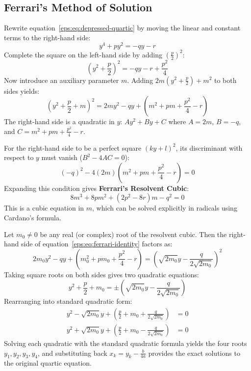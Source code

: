 \documentclass[a4paper]{article}
\begin{document}
\subsection{Ferrari's Method of Solution}
Rewrite equation~\eqref{eps:eq:depressed-quartic} by moving the linear and constant terms to the right-hand side:
\[
    y^4 + p y^2 = -q y - r
\]
Complete the square on the left-hand side by adding $\left(\frac{p}{2}\right)^2$:
\[
    \left(y^2 + \frac{p}{2}\right)^2 = -q y - r + \frac{p^2}{4}
\]
Now introduce an auxiliary parameter $m$. Adding $2m\left(y^2 + \frac{p}{2}\right) + m^2$ to both sides yields:
\begin{equation}
    \left(y^2 + \frac{p}{2} + m\right)^2 = 2m y^2 - q y + \left(m^2 + pm + \frac{p^2}{4} - r\right) \label{eps:eq:ferrari-identity}
\end{equation}
The right-hand side is a quadratic in $y$: $A y^2 + B y + C$ where $A = 2m$, $B = -q$, and $C = m^2 + pm + \frac{p^2}{4} - r$.

For the right-hand side to be a perfect square $(k y + l)^2$, its discriminant with respect to $y$ must vanish ($B^2 - 4AC = 0$):
\[
    (-q)^2 - 4(2m)\left(m^2 + pm + \frac{p^2}{4} - r\right) = 0
\]
Expanding this condition gives \textbf{Ferrari's Resolvent Cubic}:
\begin{equation}
    \boxed{8m^3 + 8pm^2 + (2p^2 - 8r)m - q^2 = 0} \label{eps:eq:resolvent-cubic}
\end{equation}
This is a cubic equation in $m$, which can be solved explicitly in radicals using Cardano's formula.

Let $m_0 \ne 0$ be any real (or complex) root of the resolvent cubic. Then the right-hand side of equation~\eqref{eps:eq:ferrari-identity} factors as:
\[
    2m_0 y^2 - q y + \left(m_0^2 + pm_0 + \frac{p^2}{4} - r\right) = \left( \sqrt{2m_0} y - \frac{q}{2\sqrt{2m_0}} \right)^2
\]
Taking square roots on both sides gives two quadratic equations:
\begin{equation}
    y^2 + \frac{p}{2} + m_0 = \pm \left( \sqrt{2m_0} y - \frac{q}{2\sqrt{2m_0}} \right)
\end{equation}
Rearranging into standard quadratic form:
\begin{align}
    y^2 - \sqrt{2m_0} y + \left(\frac{p}{2} + m_0 + \frac{q}{2\sqrt{2m_0}}\right) &= 0 \\
    y^2 + \sqrt{2m_0} y + \left(\frac{p}{2} + m_0 - \frac{q}{2\sqrt{2m_0}}\right) &= 0
\end{align}
Solving each quadratic with the standard quadratic formula yields the four roots $y_1, y_2, y_3, y_4$, and substituting back $x_k = y_k - \frac{b}{4a}$ provides the exact solutions to the original quartic equation.
\end{document}
